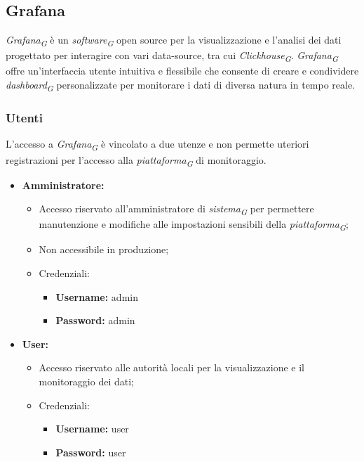 \subsection{Grafana}
\textit{Grafana}\textsubscript{\textit{G}} è un \textit{software}\textsubscript{\textit{G}} open source per la visualizzazione e l'analisi dei dati progettato per interagire con vari data-source, tra cui \textit{Clickhouse}\textsubscript{\textit{G}}. \textit{Grafana}\textsubscript{\textit{G}} offre un'interfaccia utente intuitiva e flessibile che consente di creare e condividere \textit{dashboard}\textsubscript{\textit{G}} personalizzate per monitorare i dati di diversa natura in tempo reale.

\subsubsection{Utenti}
L'accesso a \textit{Grafana}\textsubscript{\textit{G}} è vincolato a due utenze e non permette uteriori registrazioni per l'accesso alla \textit{piattaforma}\textsubscript{\textit{G}} di monitoraggio.
\begin{itemize}
    \item \textbf{Amministratore:} 
    \begin{itemize}
        \item Accesso riservato all'amministratore di \textit{sistema}\textsubscript{\textit{G}} per permettere manutenzione e modifiche alle impostazioni sensibili della \textit{piattaforma}\textsubscript{\textit{G}};
        \item Non accessibile in produzione;
        \item Credenziali:
        \begin{itemize}
            \item \textbf{Username:} admin
            \item \textbf{Password:} admin
        \end{itemize} 
    \end{itemize}
    
    \item \textbf{User:} 
    \begin{itemize}
        \item Accesso riservato alle autorità locali per la visualizzazione e il monitoraggio dei dati;
        \item Credenziali:
        \begin{itemize}
            \item \textbf{Username:} user
            \item \textbf{Password:} user
        \end{itemize} 
    \end{itemize}
\end{itemize}

